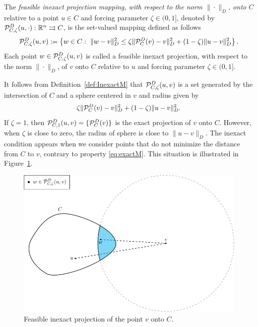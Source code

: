 \begin{definition} \label{def:InexactM}
	The {\it feasible inexact projection mapping, with respect to the norm $\| \cdot \|_{D}$,   onto $C$}  relative to a point  $u \in C$ and forcing parameter $\zeta\in (0, 1]$, denoted by ${\cal P}_{C,\zeta}^{D}(u,  \cdot): {\mathbb R}^n \rightrightarrows C$,  is the set-valued mapping defined as follows
	\begin{equation} \label{eq:Projwm}
		{\cal P}_{C,\zeta}^{D}(u, v) := \left\{w\in C:~ \|w-v\|_{D}^2\leq \zeta \| {\cal P}_{C}^{D}(v)-v\|_{D}^2+(1-\zeta)\|u-v\|_{D}^2 \right\}.
	\end{equation}
	Each point $w\in {\cal P}_{C,\zeta}^{D}(u, v) $ is called a  feasible inexact projection,  with respect to the norm $\| \cdot \|_{D}$,  of $v$ onto $C$ relative to $u$ and forcing parameter $\zeta\in (0, 1]$.
\end{definition}
\begin{remark}\normalfont
	It follows from Definition~\ref{def:InexactM} that ${\cal P}_{C,\zeta}^{D}(u, v)$ is a set generated by the intersection of $C$ and a sphere centered in $v$ and radius given by
	$$
		\zeta \| {\cal P}_{C}^{D}(v)-v\|_{D}^2+(1-\zeta)\|u-v\|_{D}^2.
	$$
	If $\zeta = 1$, then ${\cal P}_{C,1}^{D}(u, v) = \{{\cal P}_{C}^{D}(v)\}$ is the exact projection of $v$ onto $C$. However, when $\zeta$ is close to zero, the radius of sphere is close to $\|u-v\|_{D}$. The inexact condition appears when we consider points that do not minimize the distance from $C$ to $v$, contrary to property \eqref{eq:exactM}. This situation is illustrated in Figure~\ref{fig:martinezProj}.
\end{remark}\normalfont

\begin{figure}[H]
	\centering
	\includegraphics{figures/martinezProj.pdf}
	\caption{Feasible inexact projection of the point $v$ onto $C$.}
	\label{fig:martinezProj}
\end{figure}

